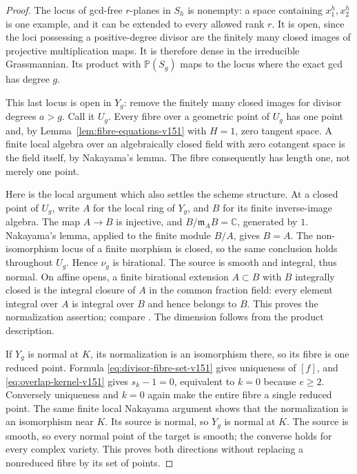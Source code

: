 \documentclass[11pt,reqno]{amsart}
\numberwithin{equation}{section}
\theoremstyle{definition}\newtheorem{definition}[theorem]{Definition}
\theoremstyle{remark}\newtheorem{remark}[theorem]{Remark}
\newcommand{\C}{\mathbb C}\newcommand{\Q}{\mathbb Q}
\newcommand{\Pj}{\mathbb P}\newcommand{\A}{\mathbb A}
\begin{document}
\begin{proof}
The locus of gcd-free \(r\)-planes in \(S_h\) is nonempty: a space
containing \(x_1^h,x_2^h\) is one example, and it can be extended
to every allowed rank \(r\).  It is open, since the loci possessing
a positive-degree divisor are the finitely many closed images of
projective multiplication maps.  It is therefore dense in the
irreducible Grassmannian.  Its product with \(\Pj(S_g)\) maps to
the locus where the exact gcd has degree \(g\).

This last locus is open in \(Y_g\): remove the finitely many closed
images for divisor degrees \(a>g\).  Call it \(U_g\).  Every fibre
over a geometric point of \(U_g\) has one point and, by
Lemma~\ref{lem:fibre-equations-v151} with \(H=1\), zero tangent
space.  A finite local algebra over an algebraically closed field
with zero cotangent space is the field itself, by Nakayama's lemma.
The fibre consequently has length one, not merely one point.

Here is the local argument which also settles the scheme structure.
At a closed point of \(U_g\), write \(A\) for the local ring of
\(Y_g\), and \(B\) for its finite inverse-image algebra.  The map
\(A\to B\) is injective, and \(B/\mathfrak m_A B=\C\), generated
by \(1\).  Nakayama's lemma, applied to the finite module \(B/A\),
gives \(B=A\).  The non-isomorphism locus of a finite morphism is
closed, so the same conclusion holds throughout \(U_g\).  Hence
\(\nu_g\) is birational.  The source is smooth and integral, thus
normal.  On affine opens, a finite birational extension \(A\subset B\)
with \(B\) integrally closed is the integral closure of \(A\) in
the common fraction field: every element integral over \(A\) is
integral over \(B\) and hence belongs to \(B\).  This proves the
normalization assertion; compare \cite[Tag~035E]{StacksNormalV151}.
The dimension follows from the product description.

If \(Y_g\) is normal at \(K\), its normalization is an isomorphism
there, so its fibre is one reduced point.  Formula
\eqref{eq:divisor-fibre-set-v151} gives uniqueness of \([f]\), and
\eqref{eq:overlap-kernel-v151} gives \(s_k-1=0\), equivalent to
\(k=0\) because \(e\geq2\).  Conversely uniqueness and \(k=0\)
again make the entire fibre a single reduced point.  The same finite
local Nakayama argument shows that the normalization is an isomorphism
near \(K\).  Its source is normal, so \(Y_g\) is normal at \(K\).
The source is smooth, so every normal point of the target is smooth;
the converse holds for every complex variety.  This proves both
directions without replacing a nonreduced fibre by its set of points.
\end{proof}
\end{document}
